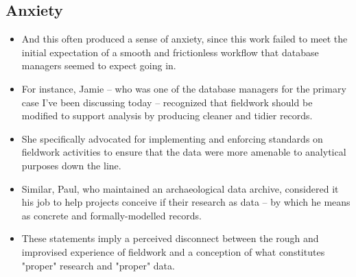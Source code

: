 \documentclass{article}
\begin{document}
\subsection{Anxiety}
\begin{itemize}
  \item And this often produced a sense of anxiety, since this work failed to meet the initial expectation of a smooth and frictionless workflow that database managers seemed to expect going in.

  \item For instance, Jamie -- who was one of the database managers for the primary case I've been discussing today -- recognized that fieldwork should be modified to support analysis by producing cleaner and tidier records.
  \item She specifically advocated for implementing and enforcing standards on fieldwork activities to ensure that the data were more amenable to analytical purposes down the line.

  \item Similar, Paul, who maintained an archaeological data archive, considered it his job to help projects conceive if their research as data -- by which he means as concrete and formally-modelled records.

  \item These statements imply a perceived disconnect between the rough and improvised experience of fieldwork and a conception of what constitutes "proper" research and "proper" data.
\end{itemize}
\end{document}
